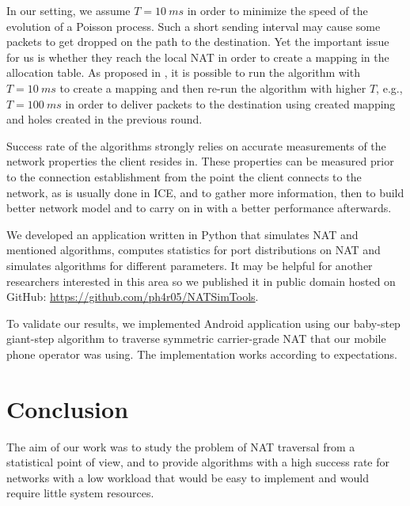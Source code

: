 \documentclass{acm_proc_article-sp}
\begin{document}
In our setting, we assume $T=10~ms$ in order to minimize the speed of the evolution of a Poisson process.
Such a short sending interval may cause some packets to get dropped on the path to the destination. Yet the 
important issue for us is whether they reach the local NAT in order to create a mapping in the allocation table. As proposed 
in \citep{Wang:2006:RSN:1156422.1156550}, it is possible to run the algorithm with $T=10~ms$ to create a mapping
and then re-run the algorithm with higher $T$, e.g., $T=100~ms$ in order to deliver packets to the destination
using created mapping and holes created in the previous round.

Success rate of the algorithms strongly relies on accurate measurements of the network 
properties the client resides in. These properties can be measured prior to the connection establishment 
from the point the client connects to the network, as is usually done in ICE, and to gather 
more information, then to build better network model and to carry on in with a better performance afterwards.

% 

We developed an application written in Python that simulates NAT and mentioned algorithms, computes
statistics for port distributions on NAT and simulates algorithms for different parameters. It
may be helpful for another researchers interested in this area so we published it in public domain
hosted on GitHub: \url{https://github.com/ph4r05/NATSimTools}.

To validate our results, we implemented Android application using our baby-step giant-step algorithm
to traverse symmetric carrier-grade NAT that our mobile phone operator was using. The implementation
works according to expectations.

\section{Conclusion}
The aim of our work was to study the problem of NAT traversal from a statistical point of view,
and to provide algorithms with a high success rate for networks with a low workload that would be easy to 
implement and would require little system resources.
\end{document}
